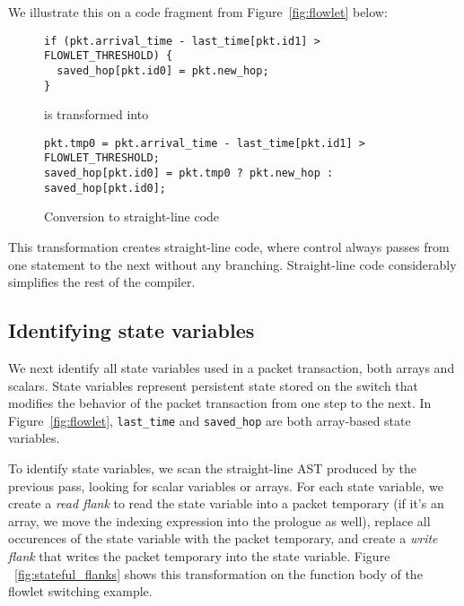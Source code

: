We illustrate this on a code fragment from Figure~\ref{fig:flowlet} below:
\begin{figure}
\begin{tiny}
\begin{lstlisting}
if (pkt.arrival_time - last_time[pkt.id1] > FLOWLET_THRESHOLD) {
  saved_hop[pkt.id0] = pkt.new_hop;
}
\end{lstlisting}
\end{tiny}
\begin{center}
is transformed into
\end{center}
\begin{tiny}
\begin{lstlisting}
pkt.tmp0 = pkt.arrival_time - last_time[pkt.id1] > FLOWLET_THRESHOLD;
saved_hop[pkt.id0] = pkt.tmp0 ? pkt.new_hop : saved_hop[pkt.id0];
\end{lstlisting}
\end{tiny}
\caption{Conversion to straight-line code}
\label{fig:if_convert}
\end{figure}

This transformation creates straight-line code, where control always passes
from one statement to the next without any branching. Straight-line code
considerably simplifies the rest of the compiler.

\subsection{Identifying state variables}

We next identify all state variables used in a packet transaction, both arrays
and scalars. State variables represent persistent state stored on the switch
that modifies the behavior of the packet transaction from one step to the next.
In Figure~\ref{fig:flowlet}, \texttt{last\_time} and \texttt{saved\_hop} are
both array-based state variables.


To identify state variables, we scan the straight-line AST produced by the
previous pass, looking for scalar variables or arrays. For each state variable,
we create a \textit{read flank} to read the state variable into a packet
temporary (if it's an array, we move the indexing expression into the prologue
as well), replace all occurences of the state variable with the packet
temporary, and create a \textit{write flank} that writes the packet temporary into the
state variable.  Figure ~\ref{fig:stateful_flanks} shows this transformation on
the function body of the flowlet switching example.

